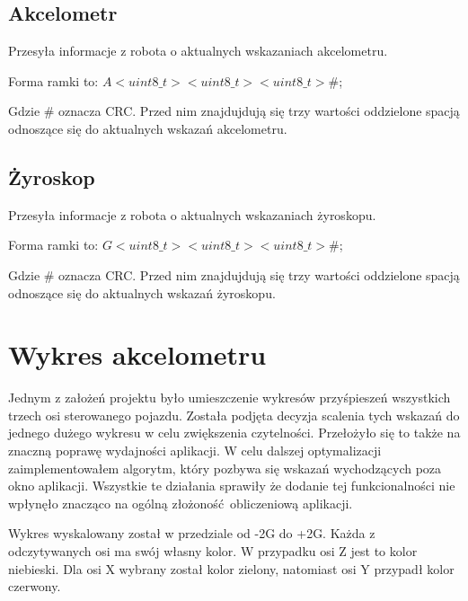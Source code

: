 \documentclass[12pt,a4paper,polish]{article}
\begin{document}
  \subsection{Akcelometr}
  Przesyła informacje z robota o aktualnych wskazaniach akcelometru.

  Forma ramki to: $A<uint8\_t> <uint8\_t> <uint8\_t>\#$;
  \newline

  Gdzie \# oznacza CRC. Przed nim znajdujdują się trzy wartości oddzielone spacją
  odnoszące się do aktualnych wskazań akcelometru.


  \subsection{Żyroskop}
  Przesyła informacje z robota o aktualnych wskazaniach żyroskopu.

  Forma ramki to: $G<uint8\_t> <uint8\_t> <uint8\_t>\#$;
  \newline

  Gdzie \# oznacza CRC. Przed nim znajdujdują się trzy wartości oddzielone spacją
  odnoszące się do aktualnych wskazań żyroskopu.

  \section{Wykres akcelometru}
  Jednym z założeń projektu było umieszczenie wykresów przyśpieszeń wszystkich
  trzech osi sterowanego pojazdu. Została podjęta decyzja scalenia tych wskazań
  do jednego dużego wykresu w celu zwiększenia czytelności. Przełożyło się to także
  na znaczną poprawę wydajności aplikacji. W celu dalszej optymalizacji 
  zaimplementowałem algorytm, który pozbywa się wskazań wychodzących poza okno 
  aplikacji. Wszystkie te działania sprawiły że dodanie tej funkcionalności
  nie wpłynęło znacząco na ogólną złożoność obliczeniową aplikacji.
  
  Wykres wyskalowany został w przedziale od -2G do +2G. Każda z odczytywanych osi
  ma swój własny kolor. W przypadku osi Z jest to kolor niebieski. 
  Dla osi X wybrany został kolor zielony, natomiast osi Y przypadł kolor czerwony.
\end{document}
